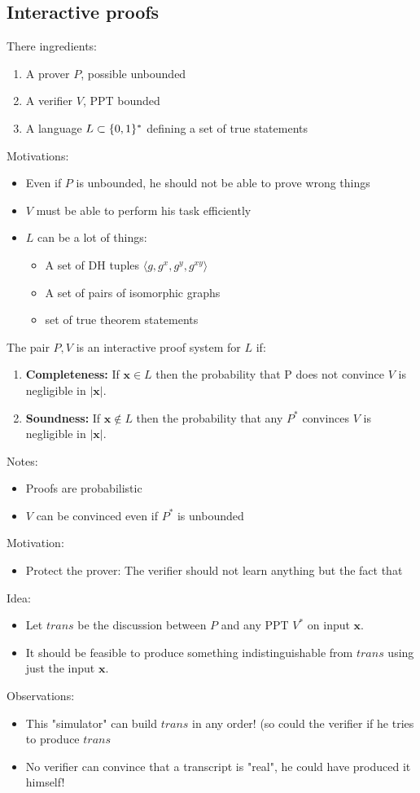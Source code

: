 \documentclass[12pt]{article}
\begin{document}
\subsection{Interactive proofs}
There ingredients:
\begin{enumerate}
\item A prover $P$, possible unbounded
\item A verifier $V$, PPT bounded
\item A language $L \subset \{0, 1\}^*$ defining a set of true statements
\end{enumerate}
Motivations:
\begin{itemize}
\item Even if $P$ is unbounded, he should not be able to prove wrong things
\item $V$ must be able to perform his task efficiently
\item $L$ can be a lot of things:
	\begin{itemize}
	\item A set of DH tuples $\langle g,g^x,g^y,g^{xy} \rangle$
	\item A set of pairs of isomorphic graphs
	\item set of true theorem statements
	\end{itemize}
\end{itemize}
\newpage

The pair $P,V$ is an interactive proof system for $L$ if:
\begin{enumerate}
\item \textbf{Completeness:} If $\mathbf{x} \in L$ then the probability that P does not convince $V$ is negligible in $|\mathbf{x}|$.
\item \textbf{Soundness:} If $\mathbf{x} \notin L$ then the probability that any $P^*$ convinces $V$ is negligible in $|\mathbf{x}|$.
\end{enumerate}
Notes:
\begin{itemize}
\item Proofs are probabilistic
\item $V$ can be convinced even if $P^*$ is unbounded
\end{itemize}

Motivation:
\begin{itemize}
\item Protect the prover: The verifier should not learn anything but the fact that \xinL
\end{itemize}
Idea:
\begin{itemize}
\item Let $trans$ be the discussion between $P$ and any PPT $V^*$ on input $\mathbf{x}$.
\item It should be feasible to produce something indistinguishable from $trans$ using just the input $\mathbf{x}$.
\end{itemize}
Observations:
\begin{itemize}
\item This "simulator" can build $trans$ in any order! (so could the verifier if he tries to produce $trans$
\item No verifier can convince that a transcript is "real", he could have produced it himself!
\end{itemize}
\end{document}
